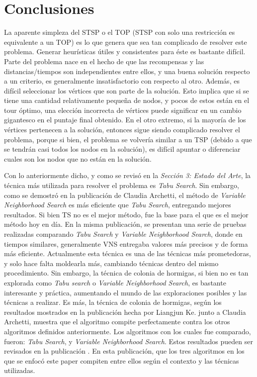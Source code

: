\documentclass[letter, 10pt]{article}
\begin{document}
\section{Conclusiones}
La aparente simpleza del STSP o el TOP (STSP con solo una restricción es equivalente a un TOP) es lo que genera que sea tan complicado de resolver este problema. Generar heurísticas útiles y consistentes para éste es bastante difícil. Parte del problema nace en el hecho de que las recompensas y las distancias/tiempos son independientes entre ellos, y una buena solución respecto a un criterio, es generalmente insatisfactorio con respecto al otro. Además, es difícil seleccionar los vértices que son parte de la solución. Esto implica que si se tiene una cantidad relativamente pequeña de nodos, y pocos de estos están en el tour óptimo, una elección incorrecta de vértices puede significar en un cambio gigantesco en el puntaje final obtenido. En el otro extremo, si la mayoría de los vértices pertenecen a la solución, entonces sigue siendo complicado resolver el problema, porque si bien, el problema se volvería similar a un TSP (debido a que se tendrán casi todos los nodos en la solución), es difícil apuntar o diferenciar cuales son los nodos que no están en la solución. 

Con lo anteriormente dicho, y como se revisó en la \textit{Sección 3: Estado del Arte}, la técnica más utilizada para resolver el problema es \textit{Tabu Search}. Sin embargo, como se demostró en la publicación de Claudia Archetti, el método de \textit{Variable Neighborhood Search} es más eficiente que \textit{Tabu Search}, entregando mejores resultados. Si bien TS no es el mejor método, fue la base para el que es el mejor método hoy en día. En la misma publicación, se presentan una serie de pruebas realizadas comparando \textit{Tabu Search} y \textit{Variable Neighborhood Search}, donde en tiempos similares, generalmente VNS entregaba valores más precisos y de forma más eficiente. Actualmente esta técnica es una de las técnicas más prometedoras, y solo hace falta moldearla más, cambiando técnicas dentro del mismo procedimiento. Sin embargo, la técnica de colonia de hormigas, si bien no es tan explorada como \textit{Tabu search} o \textit{Variable Neighborhood Search}, es bastante interesante y práctica, aumentando el mundo de las exploraciones posibles y las técnicas a realizar. 
Es más, la técnica de colonia de hormigas, según los resultados mostrados en la publicación hecha por Liangjun Ke. junto a Claudia Archetti, muestra que el algoritmo compite perfectamente contra los otros algoritmos definidos anteriormente. Los algoritmos con los cuales fue comparado, fueron: \textit{Tabu Search}, y \textit{Variable Neighborhood Search}. Estos resultados pueden ser revisados en la publicación \cite{ProblemaHormigas}. En esta publicación, que los tres algoritmos en los que se enfocó este paper compiten entre ellos según el contexto y las técnicas utilizadas. 
\end{document}
